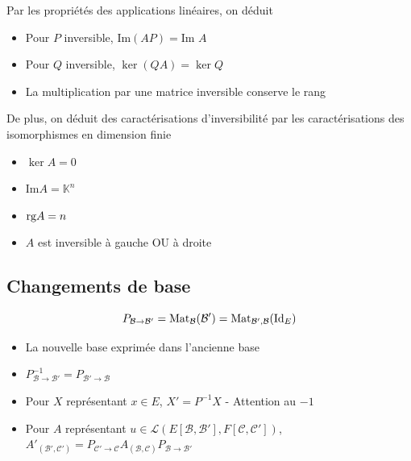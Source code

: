 \documentclass[openany]{book}
\begin{document}
\noindent Par les propriétés des applications linéaires, on déduit
\begin{itemize}
    \item Pour $P$ inversible, $\text{Im}(AP) = \text{Im } A$
    \item Pour $Q$ inversible, $\ker (QA) = \ker Q$
    \item La multiplication par une matrice inversible conserve le rang
\end{itemize}

\noindent De plus, on déduit des caractérisations d'inversibilité par les caractérisations des isomorphismes en dimension finie
\begin{itemize}
    \item $\ker A = {0}$
    \item $\text{Im} A = \mathbb{K}^n$
    \item $\text{rg} A = n$
    \item $A$ est inversible à gauche OU à droite
\end{itemize}

\subsection{Changements de base}
\[ P_{\mathcal{B} \rightarrow \mathcal{B}'} = \text{Mat}_{\mathcal{B}}(\mathcal{B}') = \text{Mat}_{\mathcal{B}',\mathcal{B}}(\text{Id}_E) \]
\begin{itemize}
    \item La nouvelle base exprimée dans l'ancienne base
    \item $ P_{\mathcal{B} \rightarrow \mathcal{B}'}^{-1} = P_{\mathcal{B}' \rightarrow \mathcal{B}} $
    \item Pour $X$ représentant $x \in E$, $ X' = P^{-1}X $ - Attention au $-1$
    \item Pour $A$ représentant $u\in \mathcal{L}(E [\mathcal{B}, \mathcal{B'}], F [\mathcal{C}, \mathcal{C'}])$, $A'_{(\mathcal{B}', \mathcal{C}')} = P_{\mathcal{C}'\rightarrow\mathcal{C}}A_{(\mathcal{B}, \mathcal{C})}P_{\mathcal{B}\rightarrow\mathcal{B}'}$
\end{itemize}
\end{document}
